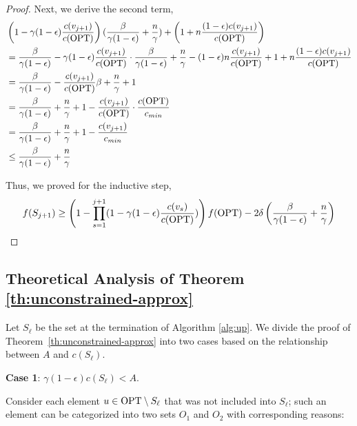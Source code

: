 \documentclass[10pt]{article} %
\theoremstyle{remark}
\newcommand{\OPT}{{\rm OPT}}
\begin{document}
\begin{proof}
Next, we derive the second term,
\begin{align*}
    &\left(1-\gamma(1-\epsilon) \frac{c(v_{j+1})}{c(\OPT)} \right)(\frac{\beta}{\gamma(1-\epsilon)}+\frac{n}{\gamma}) +  \left( 1+n\frac{(1-\epsilon)c(v_{j+1})}{ c(\OPT)} \right)\\
    &= \frac{\beta}{\gamma(1-\epsilon)} - \gamma(1-\epsilon) \frac{c(v_{j+1})}{c(\OPT)}\cdot\frac{\beta}{\gamma(1-\epsilon)}  + \frac{n}{\gamma} - (1-\epsilon) n\frac{c(v_{j+1})}{c(\OPT)} + 1 + n\frac{(1-\epsilon)c(v_{j+1})}{ c(\OPT)}\\
    &= \frac{\beta}{\gamma(1-\epsilon)} - \frac{c(v_{j+1})}{c(\OPT)}\beta  + \frac{n}{\gamma} + 1 \\
    &= \frac{\beta}{\gamma(1-\epsilon)} + \frac{n}{\gamma} + 1 - \frac{c(v_{j+1})}{c(\OPT)}\cdot \frac{c(\OPT)}{c_{min}}\\
    & = \frac{\beta}{\gamma(1-\epsilon)} + \frac{n}{\gamma} + 1 - \frac{c(v_{j+1})}{c_{min}}\\
    &\leq \frac{\beta}{\gamma(1-\epsilon)} + \frac{n}{\gamma} 
\end{align*}

Thus, we proved for the inductive step,
\[f(S_{j+1}) \geq \left( 1- \prod_{s=1}^{j+1} (1- \gamma(1-\epsilon) \frac{c(v_s)}{c(\OPT)} )   \right) f(\OPT) - 2\delta \left(\frac{\beta}{\gamma(1-\epsilon)} + \frac{n}{\gamma} \right)\]
\end{proof}


\subsection{Theoretical Analysis of Theorem \ref{th:unconstrained-approx}}



Let $S_\ell$ be the set at the termination of Algorithm \ref{alg:up}. We divide the proof of Theorem~\ref{th:unconstrained-approx} into two cases based on the relationship between $A$ and $c(S_\ell)$. 

    \textbf{Case 1}: $\gamma (1-\epsilon)c(S_\ell) < A$.
    
    Consider each element $u \in \OPT \setminus S_\ell$ that was not included into $S_\ell$; such an element can be categorized into two sets $O_1$ and $O_2$ with corresponding reasons:
\end{document}
